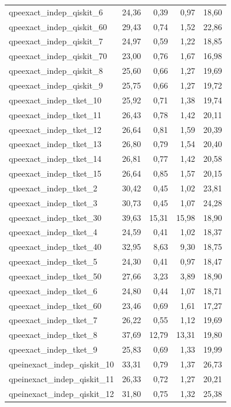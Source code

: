 \begin{longtable}{lrrrr}
qpeexact\_indep\_qiskit\_6 & 24,36 & 0,39 & 0,97 & 18,60 \\
qpeexact\_indep\_qiskit\_60 & 29,43 & 0,74 & 1,52 & 22,86 \\
qpeexact\_indep\_qiskit\_7 & 24,97 & 0,59 & 1,22 & 18,85 \\
qpeexact\_indep\_qiskit\_70 & 23,00 & 0,76 & 1,67 & 16,98 \\
qpeexact\_indep\_qiskit\_8 & 25,60 & 0,66 & 1,27 & 19,69 \\
qpeexact\_indep\_qiskit\_9 & 25,75 & 0,66 & 1,27 & 19,72 \\
qpeexact\_indep\_tket\_10 & 25,92 & 0,71 & 1,38 & 19,74 \\
qpeexact\_indep\_tket\_11 & 26,43 & 0,78 & 1,42 & 20,11 \\
qpeexact\_indep\_tket\_12 & 26,64 & 0,81 & 1,59 & 20,39 \\
qpeexact\_indep\_tket\_13 & 26,80 & 0,79 & 1,54 & 20,40 \\
qpeexact\_indep\_tket\_14 & 26,81 & 0,77 & 1,42 & 20,58 \\
qpeexact\_indep\_tket\_15 & 26,64 & 0,85 & 1,57 & 20,15 \\
qpeexact\_indep\_tket\_2 & 30,42 & 0,45 & 1,02 & 23,81 \\
qpeexact\_indep\_tket\_3 & 30,73 & 0,45 & 1,07 & 24,28 \\
qpeexact\_indep\_tket\_30 & 39,63 & 15,31 & 15,98 & 18,90 \\
qpeexact\_indep\_tket\_4 & 24,59 & 0,41 & 1,02 & 18,37 \\
qpeexact\_indep\_tket\_40 & 32,95 & 8,63 & 9,30 & 18,75 \\
qpeexact\_indep\_tket\_5 & 24,30 & 0,41 & 0,97 & 18,47 \\
qpeexact\_indep\_tket\_50 & 27,66 & 3,23 & 3,89 & 18,90 \\
qpeexact\_indep\_tket\_6 & 24,80 & 0,44 & 1,07 & 18,71 \\
qpeexact\_indep\_tket\_60 & 23,46 & 0,69 & 1,61 & 17,27 \\
qpeexact\_indep\_tket\_7 & 26,22 & 0,55 & 1,12 & 19,69 \\
qpeexact\_indep\_tket\_8 & 37,69 & 12,79 & 13,31 & 19,80 \\
qpeexact\_indep\_tket\_9 & 25,83 & 0,69 & 1,33 & 19,99 \\
qpeinexact\_indep\_qiskit\_10 & 33,31 & 0,79 & 1,37 & 26,73 \\
qpeinexact\_indep\_qiskit\_11 & 26,33 & 0,72 & 1,27 & 20,21 \\
qpeinexact\_indep\_qiskit\_12 & 31,80 & 0,75 & 1,32 & 25,38 \\

\end{longtable}
